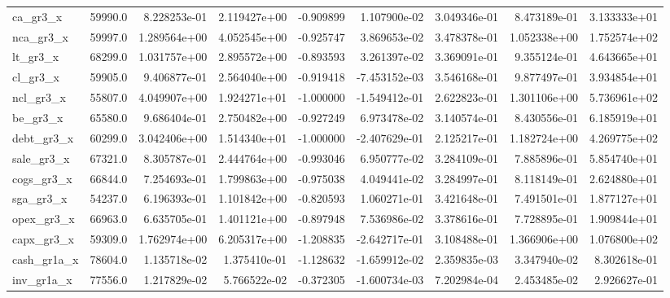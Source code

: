 \documentclass[10pt]{article}
\begin{document}
\begin{landscape}
\begin{longtable}{lrrrrrrrr}
ca\_gr3\_x                &   59990.0 &  8.228253e-01 &  2.119427e+00 &     -0.909899 &  1.107900e-02 &  3.049346e-01 &  8.473189e-01 &  3.133333e+01 \\
nca\_gr3\_x               &   59997.0 &  1.289564e+00 &  4.052545e+00 &     -0.925747 &  3.869653e-02 &  3.478378e-01 &  1.052338e+00 &  1.752574e+02 \\
lt\_gr3\_x                &   68299.0 &  1.031757e+00 &  2.895572e+00 &     -0.893593 &  3.261397e-02 &  3.369091e-01 &  9.355124e-01 &  4.643665e+01 \\
cl\_gr3\_x                &   59905.0 &  9.406877e-01 &  2.564040e+00 &     -0.919418 & -7.453152e-03 &  3.546168e-01 &  9.877497e-01 &  3.934854e+01 \\
ncl\_gr3\_x               &   55807.0 &  4.049907e+00 &  1.924271e+01 &     -1.000000 & -1.549412e-01 &  2.622823e-01 &  1.301106e+00 &  5.736961e+02 \\
be\_gr3\_x                &   65580.0 &  9.686404e-01 &  2.750482e+00 &     -0.927249 &  6.973478e-02 &  3.140574e-01 &  8.430556e-01 &  6.185919e+01 \\
debt\_gr3\_x              &   60299.0 &  3.042406e+00 &  1.514340e+01 &     -1.000000 & -2.407629e-01 &  2.125217e-01 &  1.182724e+00 &  4.269775e+02 \\
sale\_gr3\_x              &   67321.0 &  8.305787e-01 &  2.444764e+00 &     -0.993046 &  6.950777e-02 &  3.284109e-01 &  7.885896e-01 &  5.854740e+01 \\
cogs\_gr3\_x              &   66844.0 &  7.254693e-01 &  1.799863e+00 &     -0.975038 &  4.049441e-02 &  3.284997e-01 &  8.118149e-01 &  2.624880e+01 \\
sga\_gr3\_x               &   54237.0 &  6.196393e-01 &  1.101842e+00 &     -0.820593 &  1.060271e-01 &  3.421648e-01 &  7.491501e-01 &  1.877127e+01 \\
opex\_gr3\_x              &   66963.0 &  6.635705e-01 &  1.401121e+00 &     -0.897948 &  7.536986e-02 &  3.378616e-01 &  7.728895e-01 &  1.909844e+01 \\
capx\_gr3\_x              &   59309.0 &  1.762974e+00 &  6.205317e+00 &     -1.208835 & -2.642717e-01 &  3.108488e-01 &  1.366906e+00 &  1.076800e+02 \\
cash\_gr1a\_x             &   78604.0 &  1.135718e-02 &  1.375410e-01 &     -1.128632 & -1.659912e-02 &  2.359835e-03 &  3.347940e-02 &  8.302618e-01 \\
inv\_gr1a\_x              &   77556.0 &  1.217829e-02 &  5.766522e-02 &     -0.372305 & -1.600734e-03 &  7.202984e-04 &  2.453485e-02 &  2.926627e-01 \\

\end{longtable}
\end{landscape}
\end{document}

